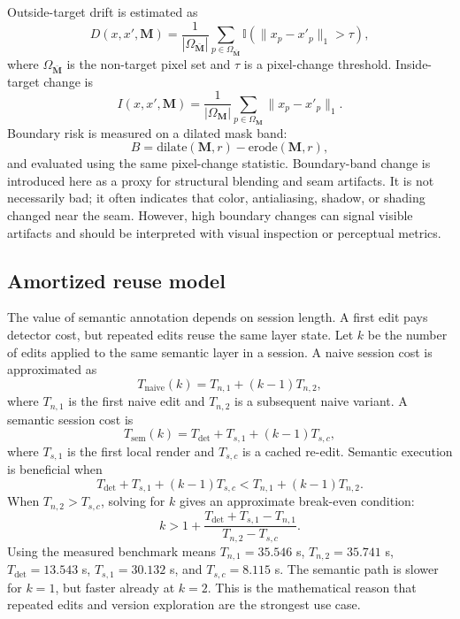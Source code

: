 \documentclass[final,5p,times,number,sort&compress]{elsarticle}
\newcommand{\mask}{\mathbf{M}}
\begin{document}
Outside-target drift is estimated as
\begin{equation}
    D(x,x',\mask) = \frac{1}{|\Omega_{\bar{\mask}}|}
    \sum_{p \in \Omega_{\bar{\mask}}} \mathbb{I}\left(\|x_p - x'_p\|_1 > \tau\right),
\end{equation}
where \(\Omega_{\bar{\mask}}\) is the non-target pixel set and \(\tau\) is a pixel-change threshold. Inside-target change is
\begin{equation}
    I(x,x',\mask) = \frac{1}{|\Omega_{\mask}|}
    \sum_{p \in \Omega_{\mask}} \|x_p-x'_p\|_1.
\end{equation}
Boundary risk is measured on a dilated mask band:
\begin{equation}
    B = \mathrm{dilate}(\mask,r) - \mathrm{erode}(\mask,r),
\end{equation}
and evaluated using the same pixel-change statistic. Boundary-band change is introduced here as a proxy for structural blending and seam artifacts. It is not necessarily bad; it often indicates that color, antialiasing, shadow, or shading changed near the seam. However, high boundary changes can signal visible artifacts and should be interpreted with visual inspection or perceptual metrics.

\subsection{Amortized reuse model}

The value of semantic annotation depends on session length. A first edit pays detector cost, but repeated edits reuse the same layer state. Let \(k\) be the number of edits applied to the same semantic layer in a session. A naive session cost is approximated as
\begin{equation}
    T_{\mathrm{naive}}(k) = T_{n,1} + (k-1)T_{n,2},
\end{equation}
where \(T_{n,1}\) is the first naive edit and \(T_{n,2}\) is a subsequent naive variant. A semantic session cost is
\begin{equation}
    T_{\mathrm{sem}}(k) = T_{\mathrm{det}} + T_{s,1} + (k-1)T_{s,c},
\end{equation}
where \(T_{s,1}\) is the first local render and \(T_{s,c}\) is a cached re-edit. Semantic execution is beneficial when
\begin{equation}
    T_{\mathrm{det}} + T_{s,1} + (k-1)T_{s,c}
    <
    T_{n,1} + (k-1)T_{n,2}.
\end{equation}
When \(T_{n,2} > T_{s,c}\), solving for \(k\) gives an approximate break-even condition:
\begin{equation}
    k >
    1 +
    \frac{T_{\mathrm{det}} + T_{s,1} - T_{n,1}}
    {T_{n,2} - T_{s,c}}.
\end{equation}
Using the measured benchmark means \(T_{n,1}=35.546\) s, \(T_{n,2}=35.741\) s, \(T_{\mathrm{det}}=13.543\) s, \(T_{s,1}=30.132\) s, and \(T_{s,c}=8.115\) s. The semantic path is slower for \(k=1\), but faster already at \(k=2\). This is the mathematical reason that repeated edits and version exploration are the strongest use case.
\end{document}
